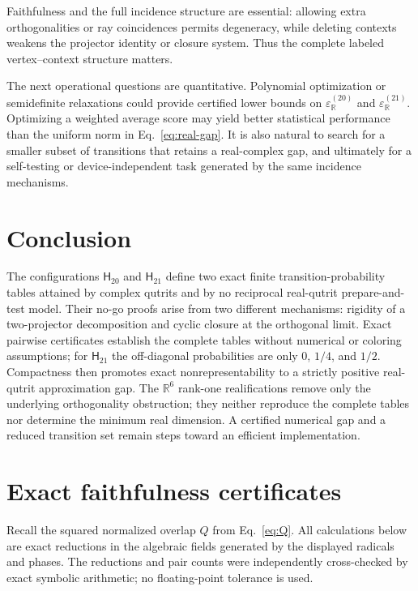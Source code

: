 \documentclass[twocolumn,aps,pra,floatfix,amsmath,amssymb,longbibliography]{revtex4-2}
\theoremstyle{definition}
\theoremstyle{remark}
\newcommand{\R}{\mathbb R}
\newcommand{\Htwenty}{\mathsf H_{20}}
\newcommand{\Htwentyone}{\mathsf H_{21}}
\begin{document}
Faithfulness and the full incidence structure are essential: allowing extra
orthogonalities or ray coincidences permits degeneracy, while deleting
contexts weakens the projector identity or closure system.  Thus the complete
labeled vertex--context structure matters.

The next operational questions are quantitative.  Polynomial optimization or
semidefinite relaxations could provide certified lower bounds on
$\varepsilon_{\R}^{(20)}$ and $\varepsilon_{\R}^{(21)}$.  Optimizing a weighted
average score may yield better statistical performance than the uniform norm
in Eq.~\eqref{eq:real-gap}.  It is also natural to search for a smaller subset
of transitions that retains a real-complex gap, and ultimately for a
self-testing or device-independent task generated by the same incidence
mechanisms.

\section{Conclusion}

The configurations $\Htwenty$ and $\Htwentyone$ define two exact finite
transition-probability tables attained by complex qutrits and by no reciprocal
real-qutrit prepare-and-test model.  Their no-go proofs arise from two
different mechanisms: rigidity of a two-projector decomposition and cyclic
closure at the orthogonal limit.  Exact pairwise certificates establish the
complete tables without numerical or coloring assumptions; for
$\Htwentyone$ the off-diagonal probabilities are only $0$, $1/4$, and $1/2$.
Compactness then promotes exact nonrepresentability to a strictly positive
real-qutrit approximation gap.  The $\R^6$ rank-one realifications remove only
the underlying orthogonality obstruction; they neither reproduce the complete
tables nor determine the minimum real dimension.  A certified numerical gap
and a reduced transition set remain steps toward an efficient implementation.

\appendix

\section{Exact faithfulness certificates}
\label{app:faithfulness}

Recall the squared normalized overlap $Q$ from Eq.~\eqref{eq:Q}.  All
calculations below are exact reductions in the
algebraic fields generated by the displayed radicals and phases.  The
reductions and pair counts were independently cross-checked by exact symbolic
arithmetic; no floating-point tolerance is used.
\end{document}
